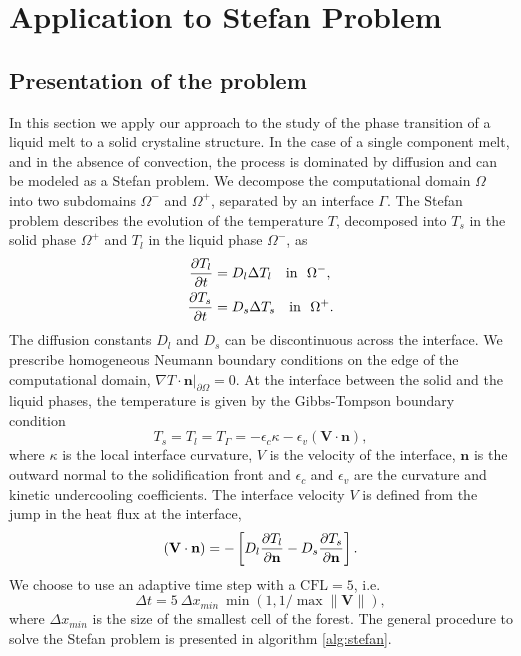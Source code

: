 \section{Application to Stefan Problem} \label{sec:application}

\subsection{Presentation of the problem}

In this section we apply our approach to the study of the phase transition of a liquid melt to a solid crystaline structure. In the case of a single component melt, and in the absence of convection, the process is dominated by diffusion and can be modeled as a Stefan problem. We decompose the computational domain $\Omega$ into   two subdomains $\Omega^-$ and $\Omega^+$, separated by an interface $\Gamma$. The Stefan problem describes the evolution of the temperature $T$, decomposed into $T_s$ in the solid phase $\Omega^+$ and $T_l$ in the liquid phase $\Omega^-$, as
\begin{align}
\frac{\partial T_l}{\partial t} & = D_l \Delta T_l \quad \mathrm{in} ~~ \Omega^-, \label{eq:stefan_heat_equation_l} \\
\frac{\partial T_s}{\partial t} & = D_s \Delta T_s \quad \mathrm{in} ~~ \Omega^+. \label{eq:stefan_heat_equation_s}
\end{align}
The diffusion constants $D_l$ and $D_s$ can be discontinuous across the interface. We prescribe homogeneous Neumann boundary conditions on the edge of the computational domain, $\nabla T \cdot \mathbf{n}\vert_{\partial \Omega}=0$. At the interface between the solid and the liquid phases, the temperature is given by the Gibbs-Tompson boundary condition \cite{Alexiades;Solomon;Wilson:88:The-formation-of-a-s, Alexiades;Solomon:93:Mathematical-Modelin}
\begin{equation} \label{eq:stefan_gibbs_tompson}
T_s = T_l = T_{\Gamma} = -\epsilon_c \kappa - \epsilon_v (\mathbf{V} \cdot \mathbf{n}),
\end{equation}
where $\kappa$ is the local interface curvature, $V$ is the velocity of the interface, $\mathbf{n}$ is the outward normal to the solidification front and $\epsilon_c$ and $\epsilon_v$ are the curvature and kinetic undercooling coefficients. The interface velocity $V$ is defined from the jump in the heat flux at the interface,
\begin{equation} \label{eq:stefan_velocity}
(\mathbf{V} \cdot \mathbf{n}) = - \left[ D_l \frac{\partial T_l}{\partial \mathbf{n}} - D_s \frac{\partial T_s}{\partial \mathbf{n}} \right].
\end{equation}
We choose to use an adaptive time step with a $\text{CFL} = 5$, i.e.
\begin{equation} \label{eq:stefan_dt}
\Delta t = 5 ~ \Delta x_{min} ~ \min(1,1/\max \lVert \mathbf{V} \rVert),
\end{equation}
where $\Delta x_{min}$ is the size of the smallest cell of the forest. The general procedure to solve the Stefan problem is presented in algorithm \ref{alg:stefan}.

